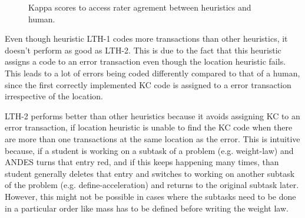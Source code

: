 \documentclass[conference]{IEEEtran}
\begin{document}
\begin{figure}
  \centering
   \caption{Kappa scores to access rater agrement between heuristics and human.}
    \label{Kappa}
\end{figure}

Even though heuristic LTH-1 codes more transactions than other heuristics, it doesn't perform as good as LTH-2. This is due to the fact that this heuristic assigns a code to an error transaction even though the location heuristic fails. This leads to a lot of errors being coded differently compared to that of a human, since the first correctly implemented KC code is assigned to a error transaction irrespective of the location.

LTH-2 performs better than other heuristics because it avoids assigning KC to an error transaction, if location heuristic is unable to find the KC code when there are more than one transactions at the same location as the error. This is intuitive because, if a student is working on a subtask of a problem (e.g. weight-law) and ANDES turns that entry red, and if this keeps happening many times, than student generally deletes that entry and switches to working on another subtask of the problem (e.g. define-acceleration) and returns to the original subtask later. However, this might not be possible in cases where the subtasks need to be done in a particular order like mass has to be defined before writing the weight law.
\end{document}
